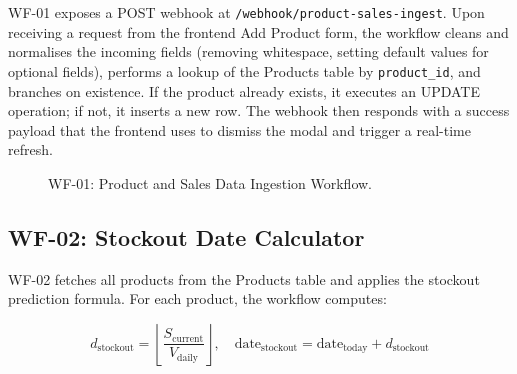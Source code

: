 WF-01 exposes a POST webhook at \texttt{/webhook/product-sales-ingest}. Upon receiving a
request from the frontend Add Product form, the workflow cleans and normalises the incoming
fields (removing whitespace, setting default values for optional fields), performs a lookup of
the Products table by \texttt{product\_id}, and branches on existence. If the product already
exists, it executes an UPDATE operation; if not, it inserts a new row. The webhook then responds
with a success payload that the frontend uses to dismiss the modal and trigger a real-time
refresh.

\begin{figure}[H]
\centering
{}
\caption{WF-01: Product and Sales Data Ingestion Workflow.}
\label{fig:wf01}
\end{figure}

\subsection{WF-02: Stockout Date Calculator}

WF-02 fetches all products from the Products table and applies the stockout prediction
formula. For each product, the workflow computes:

\begin{equation}
d_{\text{stockout}} = \left\lfloor \frac{S_{\text{current}}}{V_{\text{daily}}} \right\rfloor, \quad
\text{date}_{\text{stockout}} = \text{date}_{\text{today}} + d_{\text{stockout}}
\label{eq:stockout}
\end{equation}

